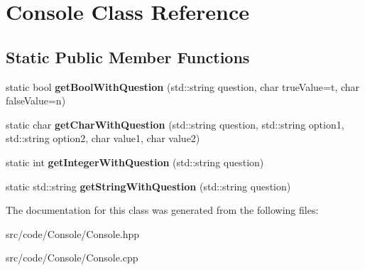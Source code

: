 \hypertarget{class_console}{}\section{Console Class Reference}
\label{class_console}
\subsection*{Static Public Member Functions}
\begin{DoxyCompactItemize}
\item 
\mbox{\label{class_console_a6f8ac9c6dd5aadd41afab40e27df4810}} 
static bool {\bfseries get\+Bool\+With\+Question} (std\+::string question, char true\+Value=\textquotesingle{}t\textquotesingle{}, char false\+Value=\textquotesingle{}n\textquotesingle{})
\item 
\mbox{\label{class_console_a9c1eaf9f03786ae1b5e84c1a3fa968ca}} 
static char {\bfseries get\+Char\+With\+Question} (std\+::string question, std\+::string option1, std\+::string option2, char value1, char value2)
\item 
\mbox{\label{class_console_adee581fc6f588e253a9fcefb2d986c12}} 
static int {\bfseries get\+Integer\+With\+Question} (std\+::string question)
\item 
\mbox{\label{class_console_a84d71db4ba83dadb2a53c39cc3578db9}} 
static std\+::string {\bfseries get\+String\+With\+Question} (std\+::string question)
\end{DoxyCompactItemize}


The documentation for this class was generated from the following files\+:\begin{DoxyCompactItemize}
\item 
src/code/\+Console/Console.\+hpp\item 
src/code/\+Console/Console.\+cpp\end{DoxyCompactItemize}
